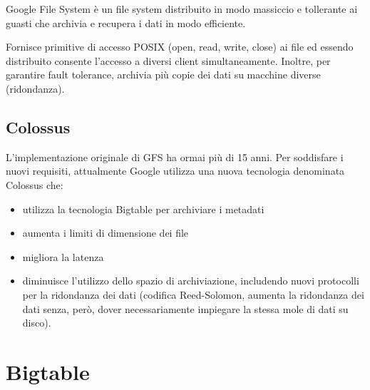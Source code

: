 Google File System è un file system distribuito in modo massiccio e tollerante ai guasti che archivia e recupera i dati in modo efficiente.

Fornisce primitive di accesso POSIX (open, read, write, close) ai file ed essendo distribuito consente l'accesso a diversi client simultaneamente. Inoltre, per garantire fault tolerance, archivia più copie dei dati su macchine diverse (ridondanza).

\subsection{Colossus}

L'implementazione originale di GFS ha ormai più di 15 anni. Per soddisfare i nuovi requisiti, attualmente Google utilizza una nuova tecnologia denominata Colossus che: 

\begin{itemize}
    \item utilizza la tecnologia Bigtable per archiviare i metadati 
    \item aumenta i limiti di dimensione dei file
    \item migliora la latenza 
    \item diminuisce l'utilizzo dello spazio di archiviazione, includendo nuovi protocolli per la ridondanza dei dati (codifica Reed-Solomon, aumenta la ridondanza dei dati senza, però, dover necessariamente impiegare la stessa mole di dati su disco).
\end{itemize}


\begin{comment}

L'implementazione attuale è evoluta e più decentralizzata. I client di GFS sono programmi che vogliono accedere a questi file. Accedono ai file tramite due tipi di flow:
- control flow (nero): comunicano con dei server o processi master (anch'essi replicati). Chiedendo dove possono localizzare i file. I master danno una lista di locazioni in cui sono disponibili. File vengono separati in diversi frammenti e ciascuno di questi viene copiati attraverso diversi chunkserver. Il master comunica che il file è diviso in N chunks e dove si trovano questi.
- data flow (verde)

\end{comment}

\section{Bigtable}

